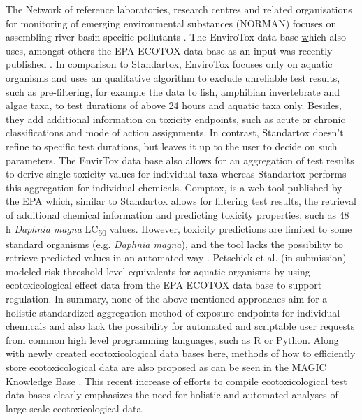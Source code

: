 The Network of reference laboratories, research centres and related organisations for monitoring of emerging environmental substances (NORMAN) focuses on assembling river basin specific pollutants \citep{von_der_ohe_new_2011}. The EnviroTox data base \href{https://envirotoxdatabase.org/} which also uses, amongst others the EPA ECOTOX data base as an input was recently published \citep{healthandenvironmentalsciencesinstitutehesi_envirotox_2019, connors_creation_2019}. In comparison to Standartox, EnviroTox focuses only on aquatic organisms and uses an qualitative algorithm to exclude unreliable test results, such as pre-filtering, for example the data to fish, amphibian invertebrate and algae taxa, to test durations of above 24 hours and aquatic taxa only. Besides, they add additional information on toxicity endpoints, such as acute or chronic classifications and mode of action assignments. In contrast, Standartox doesn't refine to specific test durations, but leaves it up to the user to decide on such parameters. The EnvirTox data base also allows for an aggregation of test results to derive single toxicity values for individual taxa whereas Standartox performs this aggregation for individual chemicals. Comptox, is a web tool published by the EPA which, similar to Standartox allows for filtering test results, the retrieval of additional chemical information and predicting toxicity properties, such as 48 h \textit{Daphnia magna} LC\textsubscript{50} values. However, toxicity predictions are limited to some standard organisms (e.g. \textit{Daphnia magna}), and the tool lacks the possibility to retrieve predicted values in an automated way \citep{williams_comptox_2017}. Petschick et al. (in submission) modeled risk threshold level equivalents for aquatic organisms by using ecotoxicological effect data from the EPA ECOTOX data base to support regulation. In summary, none of the above mentioned approaches aim for a holistic standardized aggregation method of exposure endpoints for individual chemicals and also lack the possibility for automated and scriptable user requests from common high level programming languages, such as R or Python. Along with newly created ecotoxicological data bases here, methods of how to efficiently store ecotoxicological data are also proposed as can be seen in the MAGIC Knowledge Base \citep{bub_graphing_2019}. This recent increase of efforts to compile ecotoxicological test data bases clearly emphasizes the need for holistic and automated analyses of large-scale ecotoxicological data. 

